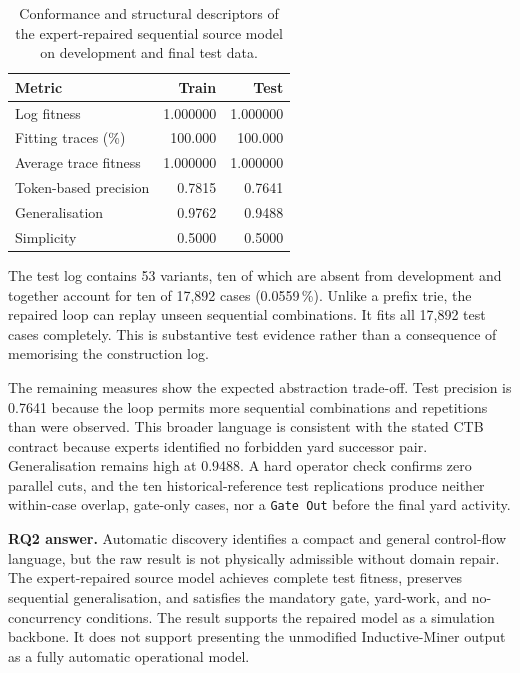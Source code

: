 \begin{table}[htbp]
\centering
\begin{tabular}{lrr}
\toprule
\textbf{Metric} & \textbf{Train} & \textbf{Test} \\
\midrule
Log fitness                      & 1.000000 & 1.000000 \\
Fitting traces (\%)              & 100.000 & 100.000 \\
Average trace fitness            & 1.000000 & 1.000000 \\
Token-based precision            & 0.7815 & 0.7641 \\
Generalisation                   & 0.9762 & 0.9488 \\
Simplicity                       & 0.5000 & 0.5000 \\
\bottomrule
\end{tabular}
\caption{Conformance and structural descriptors of the expert-repaired
sequential source model on development and final test data.}
\label{tab:conformance_train_test}
\end{table}

The test log contains 53 variants, ten of which are absent from development and
together account for ten of 17,892 cases (0.0559\,\%). Unlike a prefix trie,
the repaired loop can replay unseen sequential combinations. It fits all
17,892 test cases completely. This is substantive test evidence rather than a
consequence of memorising the construction log.

The remaining measures show the expected abstraction trade-off. Test precision
is 0.7641 because the loop permits more sequential combinations and
repetitions than were observed. This broader language is consistent with the
stated CTB contract because experts identified no forbidden yard successor
pair. Generalisation remains high at 0.9488. A hard operator check confirms
zero parallel cuts, and the ten historical-reference test replications produce neither
within-case overlap, gate-only cases, nor a \texttt{Gate Out} before the final
yard activity.

\medskip

\noindent\textbf{RQ2 answer.} Automatic discovery identifies a compact and
general control-flow language, but the raw result is not physically admissible
without domain repair. The expert-repaired source model achieves complete test
fitness, preserves sequential generalisation, and satisfies the mandatory
gate, yard-work, and no-concurrency conditions. The result supports the
repaired model as a simulation backbone. It does not support presenting the
unmodified Inductive-Miner output as a fully automatic operational model.

